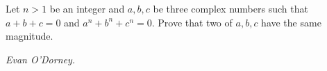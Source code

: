 Let $n>1$ be an integer and $a,b,c$ be three complex numbers such that $a+b+c=0$ and $a^n+b^n+c^n=0$. Prove that two of $a,b,c$ have the same magnitude.

\textit{Evan O'Dorney.}